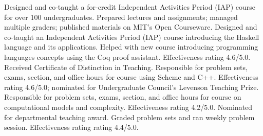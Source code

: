   {}{Designed and co-taught a for-credit Independent Activities Period (IAP) course for over 100 undergraduates.  Prepared lectures and assignments; managed multiple graders; published materials on MIT's Open Courseware.}
  {}{Designed and co-taught an Independent Activities Period (IAP) course introducing the Haskell language and its applications.}
  {}{Helped with new course introducing programming languages concepts using the Coq proof assistant.  Effectiveness rating 4.6/5.0.  Received Certificate of Distinction in Teaching.}
  {Responsible for problem sets, exams, section, and office hours for course using Scheme and C++.  Effectiveness rating 4.6/5.0; nominated for Undergraduate Council's Levenson Teaching Prize.}
  {Responsible for problem sets, exams, section, and office hours for course on computational models and complexity.  Effectiveness rating 4.2/5.0.  Nominated for departmental teaching award.}
  {Graded problem sets and ran weekly problem session.  Effectiveness rating rating 4.4/5.0.}
